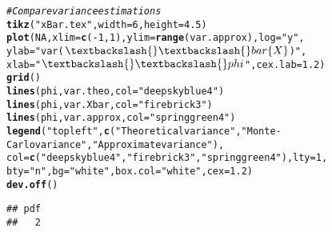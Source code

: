 \documentclass{article}\usepackage[]{graphicx}\usepackage[]{color}
\makeatletter
\newcommand{\hlnum}[1]{\textcolor[rgb]{0.686,0.059,0.569}{#1}}%
\newcommand{\hlstr}[1]{\textcolor[rgb]{0.192,0.494,0.8}{#1}}%
\newcommand{\hlcom}[1]{\textcolor[rgb]{0.678,0.584,0.686}{\textit{#1}}}%
\newcommand{\hlopt}[1]{\textcolor[rgb]{0,0,0}{#1}}%
\newcommand{\hlstd}[1]{\textcolor[rgb]{0.345,0.345,0.345}{#1}}%
\newcommand{\hlkwc}[1]{\textcolor[rgb]{0.333,0.667,0.333}{#1}}%
\newcommand{\hlkwd}[1]{\textcolor[rgb]{0.737,0.353,0.396}{\textbf{#1}}}%
\newenvironment{kframe}{%
 \def\at@end@of@kframe{}%
 \ifinner\ifhmode%
  \def\at@end@of@kframe{\end{minipage}}%
  \begin{minipage}{\columnwidth}%
 \fi\fi%
 \def\FrameCommand##1{\hskip\@totalleftmargin \hskip-\fboxsep
 \colorbox{shadecolor}{##1}\hskip-\fboxsep
     \hskip-\linewidth \hskip-\@totalleftmargin \hskip\columnwidth}%
 \MakeFramed {\advance\hsize-\width
   \@totalleftmargin\z@ \linewidth\hsize
   \@setminipage}}%
 {\par\unskip\endMakeFramed%
 \at@end@of@kframe}
\newenvironment{knitrout}{}{} %
\makeatother
\begin{document}
\begin{knitrout}
\begin{kframe}
\begin{alltt}
\hlcom{# Compare variance estimations}
\hlkwd{tikz}\hlstd{(}\hlstr{"xBar.tex"}\hlstd{,} \hlkwc{width} \hlstd{=} \hlnum{6}\hlstd{,} \hlkwc{height} \hlstd{=} \hlnum{4.5}\hlstd{)}
\hlkwd{plot}\hlstd{(}\hlnum{NA}\hlstd{,} \hlkwc{xlim} \hlstd{=} \hlkwd{c}\hlstd{(}\hlopt{-}\hlnum{1}\hlstd{,}\hlnum{1}\hlstd{),} \hlkwc{ylim} \hlstd{=} \hlkwd{range}\hlstd{(var.approx),} \hlkwc{log} \hlstd{=} \hlstr{"y"}\hlstd{,}
     \hlkwc{ylab} \hlstd{=} \hlstr{"var ($\textbackslash{}\textbackslash{}bar\{X\}$)"}\hlstd{,}
     \hlkwc{xlab}\hlstd{=} \hlstr{"$\textbackslash{}\textbackslash{}phi$"}\hlstd{,} \hlkwc{cex.lab} \hlstd{=} \hlnum{1.2}\hlstd{)}
\hlkwd{grid}\hlstd{()}
\hlkwd{lines}\hlstd{(phi,var.theo,} \hlkwc{col} \hlstd{=} \hlstr{"deepskyblue4"}\hlstd{)}
\hlkwd{lines}\hlstd{(phi, var.Xbar,} \hlkwc{col} \hlstd{=} \hlstr{"firebrick3"}\hlstd{)}
\hlkwd{lines}\hlstd{(phi,var.approx,} \hlkwc{col} \hlstd{=} \hlstr{"springgreen4"}\hlstd{)}
\hlkwd{legend}\hlstd{(}\hlstr{"topleft"}\hlstd{,}\hlkwd{c}\hlstd{(}\hlstr{"Theoretical variance"}\hlstd{,}\hlstr{"Monte-Carlo variance"}\hlstd{,}\hlstr{"Approximate variance"}\hlstd{),}
       \hlkwc{col} \hlstd{=} \hlkwd{c}\hlstd{(}\hlstr{"deepskyblue4"}\hlstd{,}\hlstr{"firebrick3"}\hlstd{,}\hlstr{"springgreen4"}\hlstd{),} \hlkwc{lty} \hlstd{=} \hlnum{1}\hlstd{,}
       \hlkwc{bty} \hlstd{=} \hlstr{"n"}\hlstd{,}\hlkwc{bg} \hlstd{=} \hlstr{"white"}\hlstd{,} \hlkwc{box.col} \hlstd{=} \hlstr{"white"}\hlstd{,} \hlkwc{cex} \hlstd{=} \hlnum{1.2}\hlstd{)}
\hlkwd{dev.off}\hlstd{()}
\end{alltt}
\begin{verbatim}
## pdf 
##   2
\end{verbatim}
\end{kframe}
\end{knitrout}

\begin{figure}

\end{figure}
\end{document}
